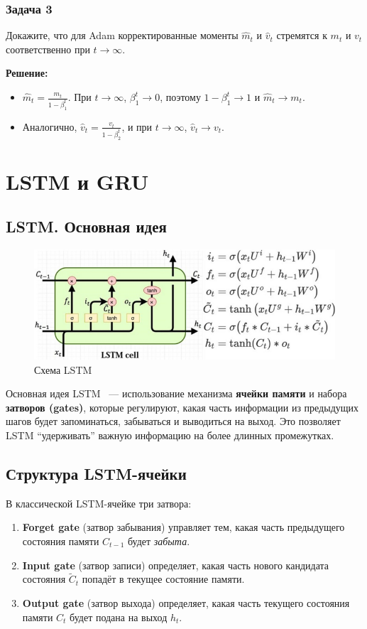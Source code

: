 \subsubsection*{Задача 3}
Докажите, что для Adam корректированные моменты $\hat{m}_t$ и $\hat{v}_t$ стремятся к $m_t$ и $v_t$ соответственно при $t \to \infty$.

\textbf{Решение:}
\begin{itemize}
    \item $\hat{m}_t = \frac{m_t}{1 - \beta_1^t}$. При $t \to \infty$, $\beta_1^t \to 0$, поэтому $1 - \beta_1^t \to 1$ и $\hat{m}_t \to m_t$.
    \item Аналогично, $\hat{v}_t = \frac{v_t}{1 - \beta_2^t}$, и при $t \to \infty$, $\hat{v}_t \to v_t$.
\end{itemize}

\section{LSTM и GRU}

\subsection{LSTM. Основная идея}

\begin{figure}[h]
	\centering
	\includegraphics[width=0.6\linewidth]{chapters/neural/images/lstm.png}
	\caption{Схема LSTM}
	\label{img:lstm}
\end{figure}
Основная идея LSTM~\cite{hochreiter1997long} --- использование механизма \textbf{ячейки памяти} и набора \textbf{затворов (gates)}, которые регулируют, какая часть информации из предыдущих шагов будет запоминаться, забываться и выводиться на выход. Это позволяет LSTM ``удерживать'' важную информацию на более длинных промежутках.

\subsection{Структура LSTM-ячейки}
В классической LSTM-ячейке три затвора:
\begin{enumerate}
    \item \textbf{Forget gate} (затвор забывания) управляет тем, какая часть предыдущего состояния памяти $C_{t-1}$ будет \textit{забыта}.
    \item \textbf{Input gate} (затвор записи) определяет, какая часть нового кандидата состояния $\tilde{C}_t$ попадёт в текущее состояние памяти.
    \item \textbf{Output gate} (затвор выхода) определяет, какая часть текущего состояния памяти $C_t$ будет подана на выход $h_t$.
\end{enumerate}

